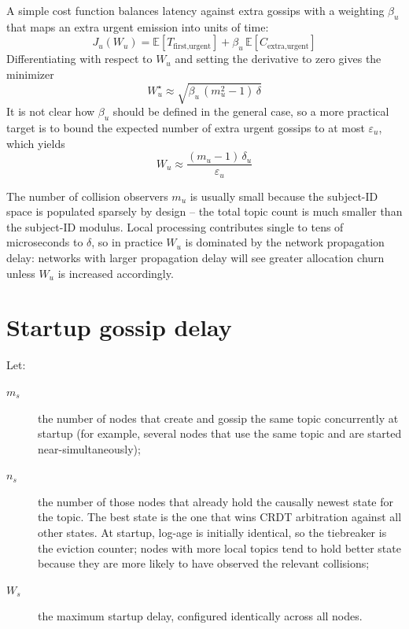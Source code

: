 A simple cost function balances latency against extra gossips with a
weighting $\beta_u$ that maps an extra urgent emission into units of time:
\begin{equation*}
    J_u(W_u) = \mathbb{E}[T_{\text{first,urgent}}]
             + \beta_u\,\mathbb{E}[C_{\text{extra,urgent}}]
\end{equation*}
Differentiating with respect to $W_u$ and setting the derivative to zero
gives the minimizer
\begin{equation*}
    W_u^\star \approx \sqrt{\beta_u\,(m_u^2 - 1)\,\delta}
\end{equation*}
It is not clear how $\beta_u$ should be defined in the general case, so a
more practical target is to bound the expected number of extra urgent
gossips to at most $\varepsilon_u$, which yields
\begin{equation*}
    W_u \approx \frac{(m_u - 1)\,\delta_u}{\varepsilon_u}
\end{equation*}

The number of collision observers $m_u$ is usually small because the
subject-ID space is populated sparsely by design -- the total topic count
is much smaller than the subject-ID modulus. Local processing contributes
single to tens of microseconds to $\delta$, so in practice $W_u$ is
dominated by the network propagation delay: networks with larger
propagation delay will see greater allocation churn unless $W_u$ is
increased accordingly.

\section{Startup gossip delay}\label{sec:appendix_gossip_delays_startup}

Let:

\begin{description}
    \item[$m_s$] the number of nodes that create and gossip the same topic
    concurrently at startup (for example, several nodes that use the same
    topic and are started near-simultaneously);
    \item[$n_s$] the number of those nodes that already hold the causally
    newest state for the topic. The best state is the one that wins CRDT
    arbitration against all other states. At startup, log-age is initially
    identical, so the tiebreaker is the eviction counter; nodes with more
    local topics tend to hold better state because they are more likely to
    have observed the relevant collisions;
    \item[$W_s$] the maximum startup delay, configured identically across
    all nodes.
\end{description}

